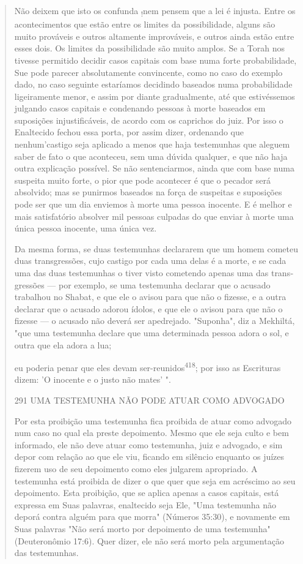 \begin{quote}
Não deixem que isto os confunda \textsubscript{!}nem pensem que a lei é
injusta. Entre os acontecimentos que estão entre os limites da
possibilidade, alguns são muito prováveis e outros altamente
improváveis, e outros ainda estão entre es­ses dois. Os limites da
possibilidade são muito amplos. Se a Torah nos tivesse permitido decidir
casos capitais com base numa forte probabilidade, Sue pode parecer
absolutamente convincente, como no caso do exemplo dado, no caso
seguinte estaríamos decidindo baseados numa probabilidade ligeiramente
me­nor, e assim por diante gradualmente, até que estivéssemos julgando
casos ca­pitais e condenando pessoas à morte baseados em suposições
injustificáveis, de acordo com os caprichos do juiz. Por isso o
Enaltecido fechou essa porta, por assim dizer, ordenando que
nenhum'castigo seja aplicado a menos que ha­ja testemunhas que aleguem
saber de fato o que aconteceu, sem uma dúvida qualquer, e que não haja
outra explicação possível. Se não sentenciarmos, ain­da que com base
numa suspeita muito forte, o pior que pode acontecer é que o pecador
será absolvido; mas se punirmos baseados na força de suspeitas e
suposições pode ser que um dia enviemos à morte uma pessoa inocente. E é
melhor e mais satisfatório absolver mil pessoas culpadas do que enviar à
morte uma única pessoa inocente, uma única vez.

Da mesma forma, se duas testemunhas declararem que um homem cometeu duas
transgressões, cujo castigo por cada uma delas é a morte, e se cada uma
das duas testemunhas o tiver visto cometendo apenas uma das
trans­gressões --- por exemplo, se uma testemunha declarar que o acusado
trabalhou no Shabat, e que ele o avisou para que não o fizesse, e a
outra declarar que o acusado adorou ídolos, e que ele o avisou para que
não o fizesse --- o acusado não deverá ser apedrejado. "Suponha", diz a
Mekhiltá, "que uma testemunha declare que uma determinada pessoa adora o
sol, e outra que ela adora a lua;

eu poderia penar que eles devam ser-reunidos\textsuperscript{418}; por
isso as Escrituras dizem: 'O inocente e o justo não mates' ".

291 UMA TESTEMUNHA NÃO PODE ATUAR COMO ADVOGADO

Por esta proibição uma testemunha fica proibida de atuar como ad­vogado
num caso no qual ela preste depoimento. Mesmo que ele seja culto e bem
informado, ele não deve atuar como testemunha, juiz e advogado, e sim
depor com relação ao que ele viu, ficando em silêncio enquanto os juízes
fize­rem uso de seu depoimento como eles julgarem apropriado. A
testemunha está proibida de dizer o que quer que seja em acréscimo ao
seu depoimento. Esta proibição, que se aplica apenas a casos capitais,
está expressa em Suas palavras, enaltecido seja Ele, "Uma testemunha não
deporá contra alguém para que mor­ra" (Números 35:30), e novamente em
Suas palavras "Não será morto por de­poimento de uma testemunha"
(Deuteronômio 17:6). Quer dizer, ele não será morto pela argumentação
das testemunhas.


\end{quote}
